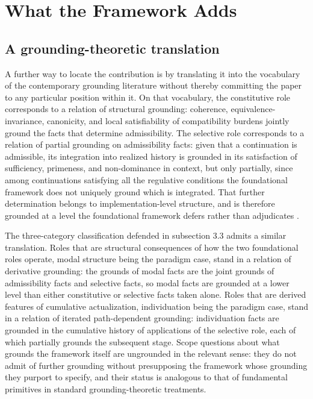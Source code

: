 \documentclass[11pt]{article}
\theoremstyle{foundation}
\begin{document}
\section{What the Framework Adds}

\subsection{A grounding-theoretic translation}

A further way to locate the contribution is by translating it into the vocabulary of the contemporary grounding literature without thereby committing the paper to any particular position within it. On that vocabulary, the constitutive role corresponds to a relation of structural grounding: coherence, equivalence-invariance, canonicity, and local satisfiability of compatibility burdens jointly ground the facts that determine admissibility. The selective role corresponds to a relation of partial grounding on admissibility facts: given that a continuation is admissible, its integration into realized history is grounded in its satisfaction of sufficiency, primeness, and non-dominance in context, but only partially, since among continuations satisfying all the regulative conditions the foundational framework does not uniquely ground which is integrated. That further determination belongs to implementation-level structure, and is therefore grounded at a level the foundational framework defers rather than adjudicates \citep{Fine2012,Schaffer2009,Rosen2010}.

The three-category classification defended in subsection 3.3 admits a similar translation. Roles that are structural consequences of how the two foundational roles operate, modal structure being the paradigm case, stand in a relation of derivative grounding: the grounds of modal facts are the joint grounds of admissibility facts and selective facts, so modal facts are grounded at a lower level than either constitutive or selective facts taken alone. Roles that are derived features of cumulative actualization, individuation being the paradigm case, stand in a relation of iterated path-dependent grounding: individuation facts are grounded in the cumulative history of applications of the selective role, each of which partially grounds the subsequent stage. Scope questions about what grounds the framework itself are ungrounded in the relevant sense: they do not admit of further grounding without presupposing the framework whose grounding they purport to specify, and their status is analogous to that of fundamental primitives in standard grounding-theoretic treatments.
\end{document}
